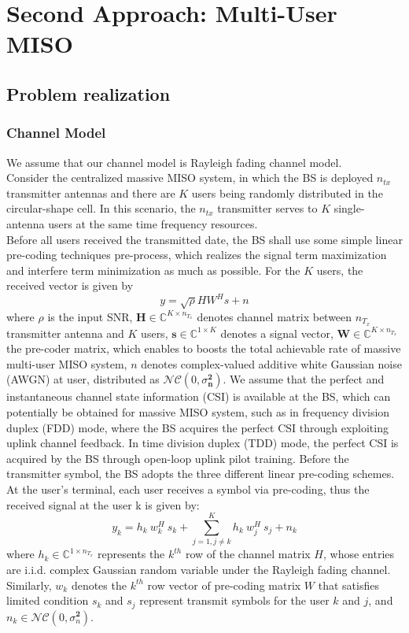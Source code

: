 \chapter{Second Approach: Multi-User MISO}

\section{Problem realization}

\subsection{Channel Model}
We assume that our channel model is Rayleigh fading channel model.\\
Consider the centralized massive MISO system, in which the BS is deployed $n_{tx}$ transmitter antennas and there are $K$ users being randomly distributed in the circular-shape cell. In this scenario, the $n_{tx}$ transmitter serves to $K$ single-antenna users at the same time frequency resources.\\
Before all users received the transmitted date, the BS shall use some simple linear pre-coding techniques pre-process, which realizes the signal term maximization and interfere term minimization as much as possible. For the $K$ users, the received vector is given by
\[ y = \sqrt{\rho} H W^H s + n \]
where $\rho$ is the input SNR, $\mathbf{H}\in\mathbb{C}^{{K \times n}_{T_x}}$ denotes channel matrix between $n_{T_x}$ transmitter antenna and $K$ users, $\mathbf{s}\in{\mathbb{C}}^{1 \times K}$ denotes a signal vector, $\mathbf{W}\in{\mathbb{C}}^{{K \times n}_{T_x}}$ the pre-coder  matrix, which enables to boosts the total achievable rate of massive multi-user MISO system, $n$ denotes complex-valued additive white Gaussian noise (AWGN) at user, distributed as $\mathcal{N} \mathcal{C} (0, \sigma^\mathbf{2}_\mathbf{n})$.
We assume that the perfect and instantaneous channel state information (CSI) is available at the BS, which can potentially be obtained for massive MISO system, such as in frequency division duplex (FDD) mode, where the BS acquires the perfect CSI through exploiting uplink channel feedback. In time division duplex (TDD) mode, the perfect CSI is acquired by the BS through open-loop uplink pilot training. Before the transmitter symbol, the BS adopts the three different linear pre-coding schemes.\\
At the user's terminal, each user receives a symbol via pre-coding, thus the received signal at the user k is given by:
\begin{equation}
    y_k=h_k\ w_k^H\ s_k+\sum_{j=1,j \neq k}^{K}{h_k\ w_j^H\ s_j}+n_k
\end{equation}
where $h_k \in \mathbb{C}^{1 \times n_{T_x}}$ represents the $k^{th}$ row of the channel matrix $H$, whose entries are i.i.d. complex Gaussian random variable under the Rayleigh fading channel. Similarly, $w_k$ denotes the $k^{th}$ row vector of pre-coding matrix $W$ that satisfies limited condition $s_k$ and $s_j$ represent transmit symbols for the user $k$ and $j$, and $n_k\in \mathcal{N} \mathcal{C}(0,\sigma^\mathbf{2}_n)$.

